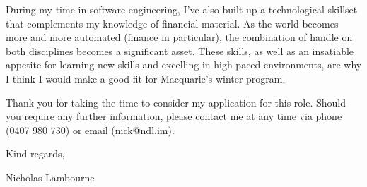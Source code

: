 \documentclass[a4paper]{article}
\begin{document}
\vspace{18pt}

During my time in software engineering, I've also built up a technological skillset that complements my knowledge of financial material. As the world becomes more and more automated (finance in particular), the combination of handle on both disciplines becomes a significant asset. These skills, as well as an insatiable appetite for learning new skills and excelling in high-paced environments, are why I think I would make a good fit for Macquarie's winter program.

\vspace{18pt}

Thank you for taking the time to consider my application for this role. Should you require any further information, please contact me at any time via phone (0407 980 730) or email (nick@ndl.im).

\vspace{30pt}

Kind regards, \\

\vspace{18pt}

Nicholas Lambourne
\end{document}
